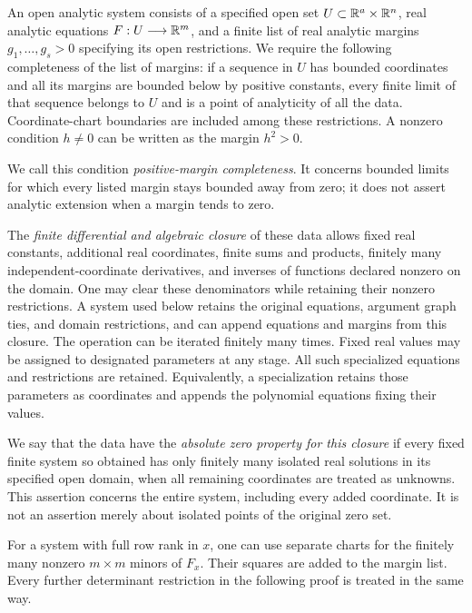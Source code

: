 \begin{definition}\label{def:counting-domain}
An open analytic system consists of a specified open set
$U\subset\mathbb{R}^a\times\mathbb{R}^n$, real analytic equations
$F:U\longrightarrow\mathbb{R}^m$, and a finite list of real analytic margins
$g_1,\ldots,g_s>0$ specifying its open restrictions.  We require the
following completeness of the list of margins: if a sequence in $U$ has
bounded coordinates and all its margins are bounded below by positive
constants, every finite limit of that sequence belongs to $U$ and is a
point of analyticity of all the data.  Coordinate-chart boundaries are
included among these restrictions.  A nonzero condition $h\ne0$ can be
written as the margin $h^2>0$.

We call this condition \emph{positive-margin completeness}.  It concerns
bounded limits for which every listed margin stays bounded away from
zero; it does not assert analytic extension when a margin tends to zero.

The \emph{finite differential and algebraic closure} of these data allows
fixed real constants, additional real coordinates, finite sums and
products, finitely many independent-coordinate derivatives, and inverses
of functions declared nonzero on the domain.  One may clear these
denominators while retaining their nonzero restrictions.  A system used
below retains the original equations, argument graph ties, and domain
restrictions, and can append equations and margins from this closure.
The operation can be iterated finitely many times.  Fixed real values
may be assigned to designated parameters at any stage.  All such
specialized equations and restrictions are retained.
Equivalently, a specialization retains those parameters as coordinates
and appends the polynomial equations fixing their values.

We say that the data have the \emph{absolute zero property for this
closure} if every fixed finite system so obtained has only finitely
many isolated real solutions in its specified open domain, when all
remaining coordinates are treated as unknowns.  This assertion concerns
the entire system, including every added coordinate.  It is not an
assertion merely about isolated points of the original zero set.
\end{definition}

For a system with full row rank in $x$, one can use separate charts for
the finitely many nonzero $m\times m$ minors of $F_x$.  Their squares
are added to the margin list.  Every further determinant restriction
in the following proof is treated in the same way.

